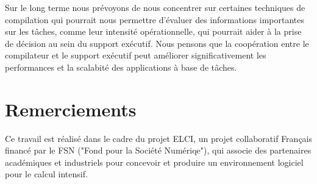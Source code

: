 \documentclass[parallelisme]{compas2016}
\begin{document}
Sur le long terme nous prévoyons de nous concentrer sur certaines techniques
de compilation qui pourrait nous permettre d'évaluer des informations
importantes sur les tâches, comme leur intensité opérationnelle, qui pourrait
aider à la prise de décision au sein du support exécutif. Nous pensons
que la coopération entre le compilateur et le support exécutif peut améliorer
significativement les performances et la scalabité des applications à base de tâches.

\vspace*{-2ex}
\section*{Remerciements}
Ce travail est réalisé dans le cadre du projet ELCI, un projet collaboratif Français financé par le FSN ("Fond pour la Société Numériqe"), qui associe des partenaires académiques et industriels pour concevoir et produire un
environnement logiciel pour le calcul intensif.


\end{document}
